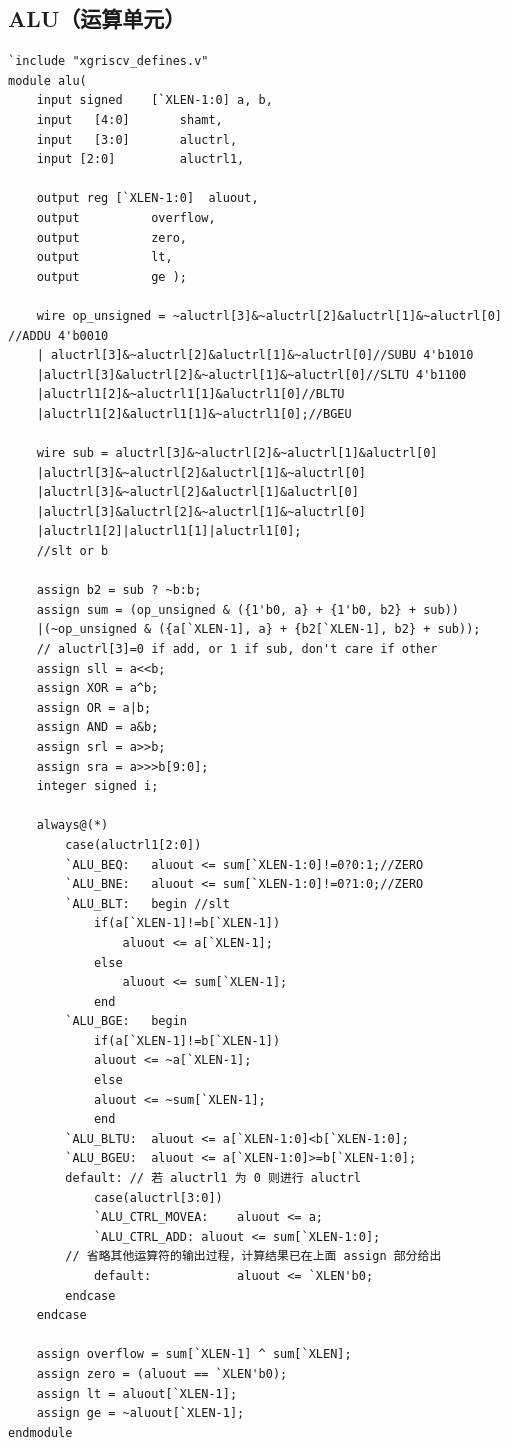 \documentclass[UTF8,a4paper,autofakebold,15pt]{ctexart}
\begin{document}
\subsection{ALU（运算单元）}

{\lstset{language=verilog}
	\begin{lstlisting}
`include "xgriscv_defines.v"
module alu(
	input signed	[`XLEN-1:0]	a, b, 
	input	[4:0]  		shamt, 
	input	[3:0]   	aluctrl, 
	input [2:0]			aluctrl1, 
	
	output reg [`XLEN-1:0]	aluout,
	output       	overflow,
	output 			zero,
	output 			lt,
	output 			ge );

	wire op_unsigned = ~aluctrl[3]&~aluctrl[2]&aluctrl[1]&~aluctrl[0]	//ADDU 4'b0010
	| aluctrl[3]&~aluctrl[2]&aluctrl[1]&~aluctrl[0]//SUBU 4'b1010
	|aluctrl[3]&aluctrl[2]&~aluctrl[1]&~aluctrl[0]//SLTU 4'b1100
	|aluctrl1[2]&~aluctrl1[1]&aluctrl1[0]//BLTU
	|aluctrl1[2]&aluctrl1[1]&~aluctrl1[0];//BGEU
	
	wire sub = aluctrl[3]&~aluctrl[2]&~aluctrl[1]&aluctrl[0]
	|aluctrl[3]&~aluctrl[2]&aluctrl[1]&~aluctrl[0]
	|aluctrl[3]&~aluctrl[2]&aluctrl[1]&aluctrl[0]
	|aluctrl[3]&aluctrl[2]&~aluctrl[1]&~aluctrl[0]
	|aluctrl1[2]|aluctrl1[1]|aluctrl1[0];
	//slt or b
	
	assign b2 = sub ? ~b:b; 
	assign sum = (op_unsigned & ({1'b0, a} + {1'b0, b2} + sub))
	|(~op_unsigned & ({a[`XLEN-1], a} + {b2[`XLEN-1], b2} + sub));
	// aluctrl[3]=0 if add, or 1 if sub, don't care if other
	assign sll = a<<b;
	assign XOR = a^b;
	assign OR = a|b;
	assign AND = a&b;
	assign srl = a>>b;
	assign sra = a>>>b[9:0];
	integer signed i;
	
	always@(*)
		case(aluctrl1[2:0])
		`ALU_BEQ:	aluout <= sum[`XLEN-1:0]!=0?0:1;//ZERO
		`ALU_BNE:	aluout <= sum[`XLEN-1:0]!=0?1:0;//ZERO
		`ALU_BLT:	begin //slt
			if(a[`XLEN-1]!=b[`XLEN-1])
				aluout <= a[`XLEN-1];
			else
				aluout <= sum[`XLEN-1];
			end
		`ALU_BGE:	begin
			if(a[`XLEN-1]!=b[`XLEN-1])
			aluout <= ~a[`XLEN-1];
			else
			aluout <= ~sum[`XLEN-1];
			end
		`ALU_BLTU:	aluout <= a[`XLEN-1:0]<b[`XLEN-1:0];
		`ALU_BGEU:	aluout <= a[`XLEN-1:0]>=b[`XLEN-1:0];
		default: // 若 aluctrl1 为 0 则进行 aluctrl
			case(aluctrl[3:0])
			`ALU_CTRL_MOVEA: 	aluout <= a;
			`ALU_CTRL_ADD: aluout <= sum[`XLEN-1:0];
		// 省略其他运算符的输出过程，计算结果已在上面 assign 部分给出
			default: 			aluout <= `XLEN'b0; 
		endcase
	endcase
	
	assign overflow = sum[`XLEN-1] ^ sum[`XLEN];
	assign zero = (aluout == `XLEN'b0);
	assign lt = aluout[`XLEN-1];
	assign ge = ~aluout[`XLEN-1];
endmodule
\end{lstlisting}}
\end{document}

